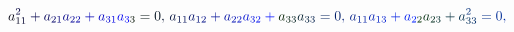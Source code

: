 \documentclass[12pt]{article}
\begin{document}
\makeatletter
\renewcommand*{\@textcolor}[3]{%
  \protect\leavevmode
  \begingroup
    \color#1{#2}#3%
  \endgroup
}
\makeatother
\begin{displaymath}
\mathcolor[RGB]{0,0,15}{a} _ { \mathcolor[RGB]{0,0,30}{1} \mathcolor[RGB]{0,0,45}{1} } ^ { \mathcolor[RGB]{0,0,60}{2} } \mathcolor[RGB]{0,0,75}{+} \mathcolor[RGB]{0,0,90}{a} _ { \mathcolor[RGB]{0,0,105}{2} \mathcolor[RGB]{0,0,120}{1} } \mathcolor[RGB]{0,0,135}{a} _ { \mathcolor[RGB]{0,0,150}{2} \mathcolor[RGB]{0,0,165}{2} } \mathcolor[RGB]{0,0,180}{+} \mathcolor[RGB]{0,0,195}{a} _ { \mathcolor[RGB]{0,0,210}{3} \mathcolor[RGB]{0,0,225}{1} } \mathcolor[RGB]{0,0,240}{a} _ { \mathcolor[RGB]{0,0,255}{3} \mathcolor[RGB]{0,15,0}{3} } \mathcolor[RGB]{0,15,15}{=} \mathcolor[RGB]{0,15,30}{0} \mathcolor[RGB]{0,15,45}{,} \mathcolor[RGB]{0,15,60}{\,
a} _ { \mathcolor[RGB]{0,15,75}{1} \mathcolor[RGB]{0,15,90}{1} } \mathcolor[RGB]{0,15,105}{a} _ { \mathcolor[RGB]{0,15,120}{1} \mathcolor[RGB]{0,15,135}{2} } \mathcolor[RGB]{0,15,150}{+} \mathcolor[RGB]{0,15,165}{a} _ { \mathcolor[RGB]{0,15,180}{2} \mathcolor[RGB]{0,15,195}{2} } \mathcolor[RGB]{0,15,210}{a} _ { \mathcolor[RGB]{0,15,225}{3} \mathcolor[RGB]{0,15,240}{2} } \mathcolor[RGB]{0,15,255}{+} \mathcolor[RGB]{0,30,0}{a} _ { \mathcolor[RGB]{0,30,15}{3} \mathcolor[RGB]{0,30,30}{3} } \mathcolor[RGB]{0,30,45}{a} _ { \mathcolor[RGB]{0,30,60}{3} \mathcolor[RGB]{0,30,75}{3} } \mathcolor[RGB]{0,30,90}{=} \mathcolor[RGB]{0,30,105}{0} \mathcolor[RGB]{0,30,120}{,} \mathcolor[RGB]{0,30,135}{\,
a} _ { \mathcolor[RGB]{0,30,150}{1} \mathcolor[RGB]{0,30,165}{1} } \mathcolor[RGB]{0,30,180}{a} _ { \mathcolor[RGB]{0,30,195}{1} \mathcolor[RGB]{0,30,210}{3} } \mathcolor[RGB]{0,30,225}{+} \mathcolor[RGB]{0,30,240}{a} _ { \mathcolor[RGB]{0,30,255}{2} \mathcolor[RGB]{0,45,0}{2} } \mathcolor[RGB]{0,45,15}{a} _ { \mathcolor[RGB]{0,45,30}{2} \mathcolor[RGB]{0,45,45}{3} } \mathcolor[RGB]{0,45,60}{+} \mathcolor[RGB]{0,45,75}{a} _ { \mathcolor[RGB]{0,45,90}{3} \mathcolor[RGB]{0,45,105}{3} } ^ { \mathcolor[RGB]{0,45,120}{2} } \mathcolor[RGB]{0,45,135}{=} \mathcolor[RGB]{0,45,150}{0} \mathcolor[RGB]{0,45,165}{,} \mathcolor[RGB]{0,45,180}{\,
}
\end{displaymath}
\end{document}
